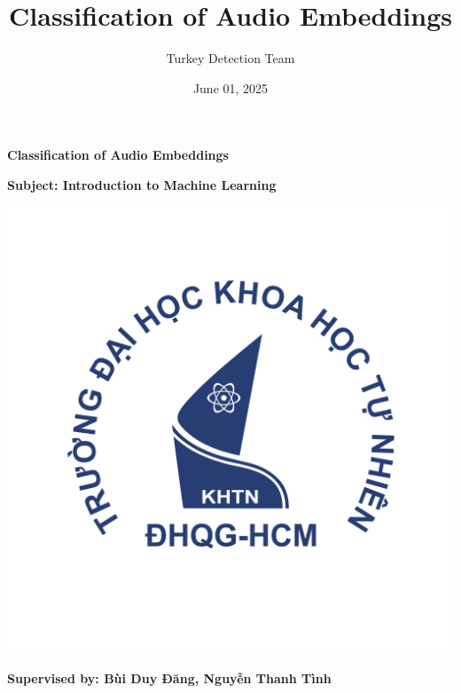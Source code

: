 \documentclass[12pt, a4paper]{article}
\title{Classification of Audio Embeddings}
\author{Turkey Detection Team}
\date{June 01, 2025}
\begin{document}
\begin{titlepage}
    \centering
    \vspace*{2cm}

    \vspace{1.5cm}

    \vspace{1.5cm}
    
    \Huge \textbf{Classification of Audio Embeddings} \\
    
    \vspace{1cm}
    
    \Large \textbf{Subject: Introduction to Machine Learning} \\
        
    \vspace{0.5cm}

    \includegraphics[scale=.40]{img/hcmus-logo.png}\\[1cm]
    
    \vspace{0.5cm}
    
    \large \textbf{Supervised by: Bùi Duy Đăng, Nguyễn Thanh Tình} \\

    \vspace{0.5cm}


\end{titlepage}
\end{document}
